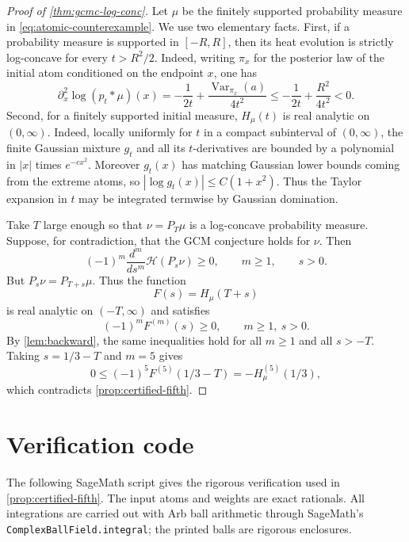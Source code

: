 \documentclass[11pt]{article}
\newcommand{\calH}{\mathcal H}
\begin{document}

\begin{proof}[Proof of \cref{thm:gcmc-log-conc}]
Let \(\mu\) be the finitely supported probability measure in \eqref{eq:atomic-counterexample}.
We use two elementary facts. First, if a probability measure is supported in \([-R,R]\), then its heat evolution is strictly log-concave for every \(t>R^2/2\). Indeed, writing \(\pi_x\) for the posterior law of the initial atom conditioned on the endpoint \(x\), one has
\[
   \partial_x^2\log(p_t*\mu)(x)
   =-\frac{1}{2t}+\frac{\operatorname{Var}_{\pi_x}(a)}{4t^2}
   \le -\frac{1}{2t}+\frac{R^2}{4t^2}<0.
\]
Second, for a finitely supported initial measure, \(H_\mu(t)\) is real
analytic on \((0,\infty)\). Indeed, locally uniformly for \(t\) in a compact
subinterval of \((0,\infty)\), the finite Gaussian mixture \(g_t\) and all its
\(t\)-derivatives are bounded by a polynomial in \(|x|\) times \(e^{-c x^2}\).
Moreover \(g_t(x)\) has matching Gaussian lower bounds coming from the extreme
atoms, so \(|\log g_t(x)|\le C(1+x^2)\). Thus the Taylor expansion in \(t\) may
be integrated termwise by Gaussian domination.

Take \(T\) large enough so that
\(
   \nu=P_T\mu
\)
is a log-concave probability measure.
Suppose, for contradiction, that the GCM conjecture holds for \(\nu\). Then
\[
   (-1)^m\frac{d^m}{ds^m}\calH(P_s\nu)\ge0,
   \qquad m\ge1,
   \qquad s>0.
\]
But \(P_s\nu=P_{T+s}\mu\). Thus the function
\[
   F(s)=H_\mu(T+s)
\]
is real analytic on \((-T,\infty)\) and satisfies
\[
   (-1)^mF^{(m)}(s)\ge0,
   \qquad m\ge1,
   \ s>0.
\]
By \cref{lem:backward}, the same inequalities hold for all \(m\ge1\) and all \(s>-T\). Taking \(s=1/3-T\) and \(m=5\) gives
\[
   0\le (-1)^5F^{(5)}(1/3-T)=-H_\mu^{(5)}(1/3),
\]
which contradicts \cref{prop:certified-fifth}.
\end{proof}





\appendix
\section{Verification code}\label{app:verification-code}

The following SageMath script gives the rigorous verification used in
\cref{prop:certified-fifth}. The input atoms and weights are exact rationals.
All integrations are carried out with Arb ball arithmetic \cite{johansson2017arb}
through SageMath's \texttt{ComplexBallField.integral}; the printed balls are
rigorous enclosures.
\end{document}

